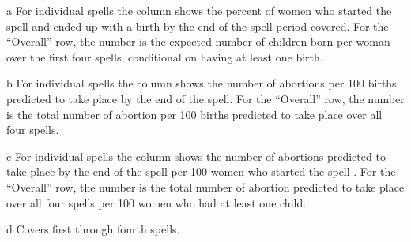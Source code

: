 \documentclass[12pt,letterpaper]{article}
\begin{document}
\begin{table}[htbp]
\begin{center}
\begin{scriptsize}
\begin{threeparttable}
\begin{tablenotes}
\item[a] For individual spells the column shows the percent of women who started the
spell and ended up with a birth by the end of the spell period covered.
For the ``Overall'' row, the number is the expected number of children born per woman over 
the first four spells, conditional on having at least one birth.
\item[b] For individual spells the column shows the number of abortions per 100
births predicted to take place by the end of the spell.
For the ``Overall'' row, the number is the total number of abortion per 100 births 
predicted to take place over all four spells.
\item[c]  For individual spells the column shows the number of abortions 
predicted to take place by the end of the spell per 100 women who started the spell .
For the ``Overall'' row, the number is the total number of abortion 
predicted to take place over all four spells per 100 women who had at least one child.
\item[d] Covers first through fourth spells. 
\end{tablenotes}
\end{threeparttable}
\end{scriptsize}
\end{center}
\end{table}
\end{document}
